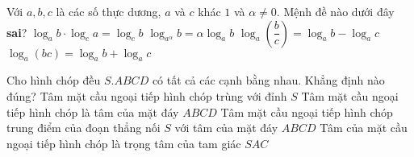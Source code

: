 \begin{ex}%
	Với $a, b, c$ là các số thực dương, $a$ và $c$ khác $1$ và $\alpha \ne 0$. Mệnh đề nào dưới đây \textbf{sai}?
	\choice
	{$\log_{a}b\cdot\log_{c}a=\log_{c}b$}
	{\True $\log_{a^{\alpha}}b=\alpha \log_{a}b$}
	{$\log_{a}\left(\dfrac{b}{c}\right)=\log_{a}b-\log_{a}c$}
	{$\log_{a}\left(bc\right)=\log_{a}b+\log_{a}c$}
\end{ex}
\begin{ex}%
	Cho hình chóp đều $S.ABCD$ có tất cả các cạnh bằng nhau. Khẳng định nào đúng?
	\choice
	{Tâm mặt cầu ngoại tiếp hình chóp trùng với đỉnh $S$}
	{\True Tâm mặt cầu ngoại tiếp hình chóp là tâm của mặt đáy $ABCD$}
	{Tâm mặt cầu ngoại tiếp hình chóp trung điểm của đoạn thẳng nối $S$ với tâm của mặt đáy $ABCD$}
	{Tâm của mặt cầu ngoại tiếp hình chóp là trọng tâm của tam giác $SAC$}
\end{ex}
